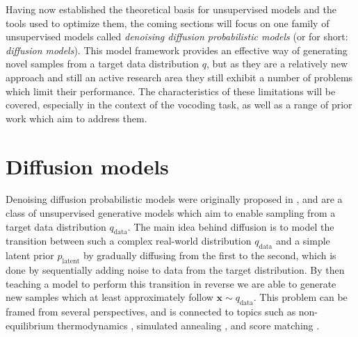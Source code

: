 \documentclass{report}
\begin{document}
Having now established the theoretical basis for unsupervised models and the tools used to optimize them, the coming sections will focus on one family of unsupervised models called \textit{denoising diffusion probabilistic models} (or for short: \textit{diffusion models}). This model framework provides an effective way of generating novel samples from a target data distribution $q$, but as they are a relatively new approach and still an active research area they still exhibit a number of problems which limit their performance. The characteristics of these limitations will be covered, especially in the context of the vocoding task, as well as a range of prior work which aim to address them.

\section{Diffusion models} \label{sec:diff}
Denoising diffusion probabilistic models were originally proposed in  \cite{Sohl-Dickstein_Weiss_Maheswaranathan_Ganguli_2015}, and are a class of unsupervised generative models which aim to enable sampling from a target data distribution $q_{\text{data}}$. The main idea behind diffusion is to model the transition between such a complex real-world distribution $q_{\text{data}}$ and a simple latent prior $p_{\text{latent}}$ by gradually diffusing from the first to the second, which is done by sequentially adding noise to data from the target distribution. By then teaching a model to perform this transition in reverse we are able to generate new samples which at least approximately follow $\bm{x} \sim q_{\text{data}}$. This problem can be framed from several perspectives, and is connected to topics such as non-equilibrium thermodynamics \cite{Sohl-Dickstein_Weiss_Maheswaranathan_Ganguli_2015}, simulated annealing \cite{neal2001annealed}, and score matching \cite{song2019generative}.
\end{document}
